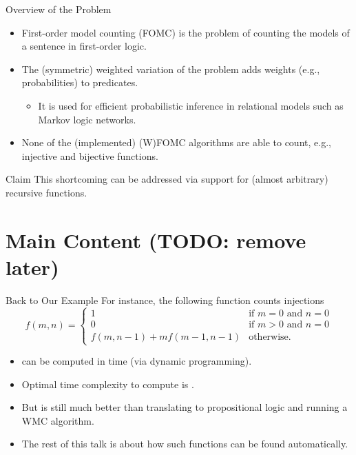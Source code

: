 \documentclass{beamer}
\begin{document}
\begin{frame}{Overview of the Problem}
  \begin{itemize}
    \item \alert{First-order model counting} (FOMC) is the problem of counting
          the models of a sentence in first-order logic.
    \item The \alert{(symmetric) weighted} variation of the problem adds weights
          (e.g., probabilities) to predicates.
          \begin{itemize}
            \item It is used for efficient \alert{probabilistic inference} in
                  relational models such as Markov logic networks.
          \end{itemize}
    \item None of the (implemented) (W)FOMC algorithms are able to count, e.g.,
          \alert{injective} and \alert{bijective} functions.
  \end{itemize}
  \begin{block}{Claim}
    This shortcoming can be addressed via support for (almost arbitrary)
    \alert{recursive functions}.
  \end{block}
\end{frame}

\section{Main Content (TODO: remove later)}

\begin{frame}{Back to Our Example}
  For instance, the following function counts injections
  \[
  f(m, n) =
  \begin{cases}
    1 & \text{if } m = 0 \text{ and } n = 0 \\
    0 & \text{if } m > 0 \text{ and } n = 0 \\
    f(m, n-1) + mf(m-1, n-1) & \text{otherwise.}
  \end{cases}
  \]
  \pause
  \begin{itemize}
    \item {} can be computed in  time (via
          dynamic programming).
    \item Optimal time complexity to compute  is
          .
    \item But  is still much better than translating to
          propositional logic and running a WMC algorithm.
    \item The rest of this talk is about how such functions can be found
          automatically.
  \end{itemize}
\end{frame}
\end{document}
